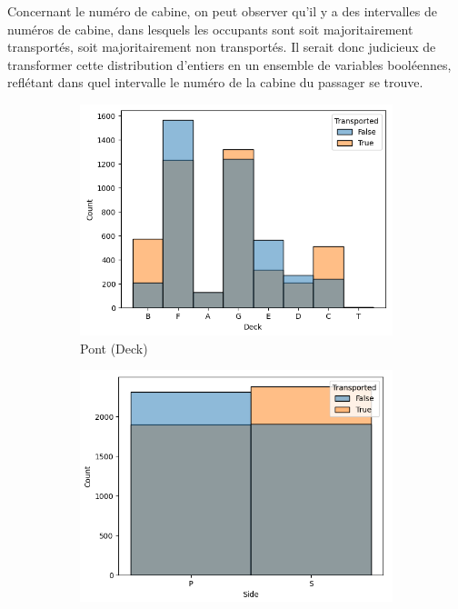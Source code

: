 \documentclass[a4paper]{article}
\begin{document}
    Concernant le numéro de cabine, on peut observer qu'il y a des intervalles de numéros de cabine, dans lesquels 
    les occupants sont soit majoritairement transportés, soit majoritairement non transportés.
    Il serait donc judicieux de transformer cette distribution d'entiers en un ensemble de variables booléennes,
    reflétant dans quel intervalle le numéro de la cabine du passager se trouve.

    \begin{figure}
        \centering
        \begin{subfigure}{.5\textwidth}
            \centering
            \includegraphics[width=\linewidth]{images/Figure 7-1.png}
            \caption{Pont (Deck)}
        \end{subfigure}%
        \begin{subfigure}{.5\textwidth}
            \centering
            \includegraphics[width=\linewidth]{images/Figure 7-2.png}

\end{subfigure}
\end{figure}
\end{document}
